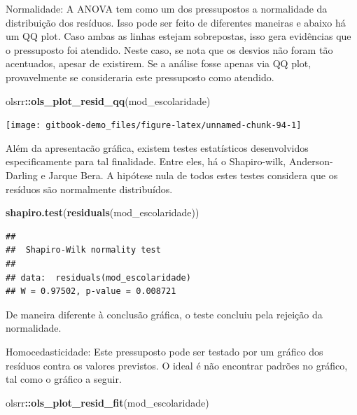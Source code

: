 \documentclass[
]{book}
\newenvironment{Shaded}{\begin{snugshade}}{\end{snugshade}}
\newcommand{\KeywordTok}[1]{\textcolor[rgb]{0.13,0.29,0.53}{\textbf{#1}}}
\newcommand{\NormalTok}[1]{#1}
\newcommand{\OperatorTok}[1]{\textcolor[rgb]{0.81,0.36,0.00}{\textbf{#1}}}
\begin{document}
Normalidade: A ANOVA tem como um dos pressupostos a normalidade da
distribuição dos resíduos. Isso pode ser feito de diferentes maneiras e
abaixo há um QQ plot. Caso ambas as linhas estejam sobrepostas, isso
gera evidências que o pressuposto foi atendido. Neste caso, se nota que
os desvios não foram tão acentuados, apesar de existirem. Se a análise
fosse apenas via QQ plot, provavelmente se consideraria este pressuposto
como atendido.

\begin{Shaded}
\begin{Highlighting}[]
\NormalTok{olsrr}\OperatorTok{::}\KeywordTok{ols_plot_resid_qq}\NormalTok{(mod_escolaridade)}
\end{Highlighting}
\end{Shaded}

\begin{center}\texttt{[image: gitbook-demo\_files/figure-latex/unnamed-chunk-94-1]} \end{center}

Além da apresentacão gráfica, existem testes estatísticos desenvolvidos
especificamente para tal finalidade. Entre eles, há o Shapiro-wilk,
Anderson-Darling e Jarque Bera. A hipótese nula de todos estes testes
considera que os resíduos são normalmente distribuídos.

\begin{Shaded}
\begin{Highlighting}[]
\KeywordTok{shapiro.test}\NormalTok{(}\KeywordTok{residuals}\NormalTok{(mod_escolaridade))}
\end{Highlighting}
\end{Shaded}

\begin{verbatim}
## 
##  Shapiro-Wilk normality test
## 
## data:  residuals(mod_escolaridade)
## W = 0.97502, p-value = 0.008721
\end{verbatim}

De maneira diferente à conclusão gráfica, o teste concluiu pela rejeição
da normalidade.

Homocedasticidade: Este pressuposto pode ser testado por um gráfico dos
resíduos contra os valores previstos. O ideal é não encontrar padrões no
gráfico, tal como o gráfico a seguir.

\begin{Shaded}
\begin{Highlighting}[]
\NormalTok{olsrr}\OperatorTok{::}\KeywordTok{ols_plot_resid_fit}\NormalTok{(mod_escolaridade)}
\end{Highlighting}
\end{Shaded}
\end{document}
